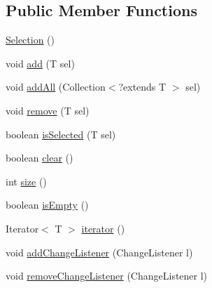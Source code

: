 \subsection*{Public Member Functions}
\begin{DoxyCompactItemize}
\item 
\hyperlink{classorg_1_1tzi_1_1use_1_1gui_1_1util_1_1_selection_3_01_t_01extends_01_selectable_01_4_a989589bf9efae9d5319d3cbfcabf6f1e}{Selection} ()
\item 
void \hyperlink{classorg_1_1tzi_1_1use_1_1gui_1_1util_1_1_selection_3_01_t_01extends_01_selectable_01_4_a4d55f7fcfca402261e09c4194bad184c}{add} (T sel)
\item 
void \hyperlink{classorg_1_1tzi_1_1use_1_1gui_1_1util_1_1_selection_3_01_t_01extends_01_selectable_01_4_acdbcd398ae1327a4c31d819902ec1d69}{add\-All} (Collection$<$?extends T $>$ sel)
\item 
void \hyperlink{classorg_1_1tzi_1_1use_1_1gui_1_1util_1_1_selection_3_01_t_01extends_01_selectable_01_4_a2868b7a142dcee726967af8cb52e2ad3}{remove} (T sel)
\item 
boolean \hyperlink{classorg_1_1tzi_1_1use_1_1gui_1_1util_1_1_selection_3_01_t_01extends_01_selectable_01_4_a627ea46f5fa76b1e6a5a36074e6ef95e}{is\-Selected} (T sel)
\item 
boolean \hyperlink{classorg_1_1tzi_1_1use_1_1gui_1_1util_1_1_selection_3_01_t_01extends_01_selectable_01_4_acc94e266cb193f0de739de17dcbe2982}{clear} ()
\item 
int \hyperlink{classorg_1_1tzi_1_1use_1_1gui_1_1util_1_1_selection_3_01_t_01extends_01_selectable_01_4_a2dcb6b6d4abb771ab1ced590a4d4078f}{size} ()
\item 
boolean \hyperlink{classorg_1_1tzi_1_1use_1_1gui_1_1util_1_1_selection_3_01_t_01extends_01_selectable_01_4_a5eddf9ea81b1a5257782b90f367a8b49}{is\-Empty} ()
\item 
Iterator$<$ T $>$ \hyperlink{classorg_1_1tzi_1_1use_1_1gui_1_1util_1_1_selection_3_01_t_01extends_01_selectable_01_4_a177609160cdceb70aad64d808dec54ec}{iterator} ()
\item 
void \hyperlink{classorg_1_1tzi_1_1use_1_1gui_1_1util_1_1_selection_3_01_t_01extends_01_selectable_01_4_ac54b8b944b63936c19f9dcdce0d6af11}{add\-Change\-Listener} (Change\-Listener l)
\item 
void \hyperlink{classorg_1_1tzi_1_1use_1_1gui_1_1util_1_1_selection_3_01_t_01extends_01_selectable_01_4_ae1ef31a0f9bf966ea1d32efc8af26529}{remove\-Change\-Listener} (Change\-Listener l)
\end{DoxyCompactItemize}
